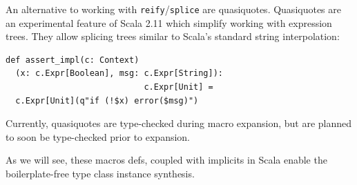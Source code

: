 \documentclass[preprint]{sigplanconf}
\begin{document}
An alternative to working with \verb|reify|/\verb|splice| are quasiquotes.
Quasiquotes are an experimental feature of Scala 2.11 which simplify working
with expression trees. They allow splicing trees similar to Scala's standard
string interpolation:
\begin{lstlisting}
def assert_impl(c: Context)
  (x: c.Expr[Boolean], msg: c.Expr[String]):
                            c.Expr[Unit] =
  c.Expr[Unit](q"if (!$x) error($msg)")
\end{lstlisting}
\noindent
Currently, quasiquotes are type-checked during macro expansion, but are
planned to soon be type-checked prior to expansion.










As we will see, these macros defs, coupled with implicits in Scala enable the
boilerplate-free type class instance synthesis.




\end{document}

